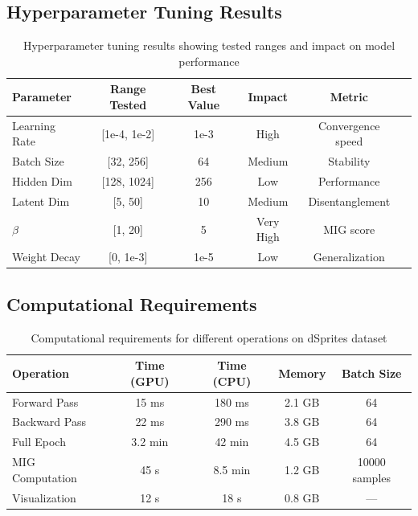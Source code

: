 \documentclass[conference]{IEEEtran}
\begin{document}
\subsection{Hyperparameter Tuning Results}

\begin{table}[H]
\centering
\small
\begin{tabular}{@{}lccccc@{}}
\toprule
\textbf{Parameter} & \textbf{Range Tested} & \textbf{Best Value} & \textbf{Impact} & \textbf{Metric} \\ \midrule
Learning Rate & [1e-4, 1e-2] & 1e-3 & High & Convergence speed \\
Batch Size & [32, 256] & 64 & Medium & Stability \\
Hidden Dim & [128, 1024] & 256 & Low & Performance \\
Latent Dim & [5, 50] & 10 & Medium & Disentanglement \\
$\beta$ & [1, 20] & 5 & Very High & MIG score \\
Weight Decay & [0, 1e-3] & 1e-5 & Low & Generalization \\ \bottomrule
\end{tabular}
\caption{Hyperparameter tuning results showing tested ranges and impact on model performance}
\label{tab:hyperparameter_tuning}
\end{table}

\subsection{Computational Requirements}

\begin{table}[H]
\centering
\begin{tabular}{@{}lcccc@{}}
\toprule
\textbf{Operation} & \textbf{Time (GPU)} & \textbf{Time (CPU)} & \textbf{Memory} & \textbf{Batch Size} \\ \midrule
Forward Pass & 15 ms & 180 ms & 2.1 GB & 64 \\
Backward Pass & 22 ms & 290 ms & 3.8 GB & 64 \\
Full Epoch & 3.2 min & 42 min & 4.5 GB & 64 \\
MIG Computation & 45 s & 8.5 min & 1.2 GB & 10000 samples \\
Visualization & 12 s & 18 s & 0.8 GB & --- \\ \bottomrule
\end{tabular}
\caption{Computational requirements for different operations on dSprites dataset}
\label{tab:computation}
\end{table}
\end{document}
